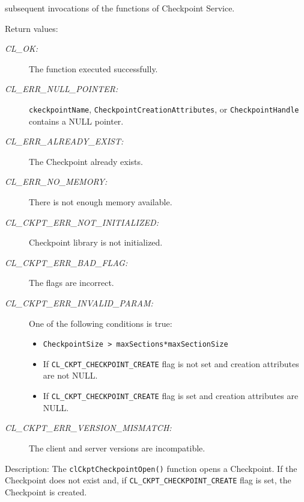 \begin{flushleft}
\begin{Desc}
\begin{description}
subsequent invocations of the functions of Checkpoint Service.\end{description}
\end{Desc}
\begin{Desc}
\item[Return values:]
\begin{description}
\item[{\em CL\_\-OK:}]The function executed successfully. 
\item[{\em CL\_\-ERR\_\-NULL\_\-POINTER:}]{\tt{ckeckpointName}}, {\tt{CheckpointCreationAttributes}}, or {\tt{CheckpointHandle}} contains a NULL pointer. 
\item[{\em CL\_\-ERR\_\-ALREADY\_\-EXIST:}]The Checkpoint already exists. 
\item[{\em CL\_\-ERR\_\-NO\_\-MEMORY:}]There is not enough memory available.
\item[{\em CL\_\-CKPT\_\-ERR\_\-NOT\_\-INITIALIZED:}]Checkpoint library is not initialized.
\item[{\em CL\_\-CKPT\_\-ERR\_\-BAD\_\-FLAG:}]The flags are incorrect.
\item[{\em CL\_\-CKPT\_\-ERR\_\-INVALID\_\-PARAM:}]One of the following conditions is true:
\begin{itemize}
\item
{\tt{CheckpointSize > maxSections*maxSectionSize}}
\item
If {\tt{CL\_\-CKPT\_\-CHECKPOINT\_\-CREATE}} flag is not set and creation attributes are not NULL.
\item
If {\tt{CL\_\-CKPT\_\-CHECKPOINT\_\-CREATE}} flag is set and creation attributes are NULL.
\end{itemize}
\item[{\em CL\_\-CKPT\_\-ERR\_\-VERSION\_\-MISMATCH:}]The client and server versions are incompatible.

\end{description}
\end{Desc}
\begin{Desc}
\item[Description:]The {\tt{clCkptCheckpointOpen()}} function opens a Checkpoint. If the Checkpoint does not exist and, if 
{\tt{CL\_\-CKPT\_\-CHECKPOINT\_\-CREATE}} flag is set, the Checkpoint is created. 


\end{Desc}
\end{flushleft}
